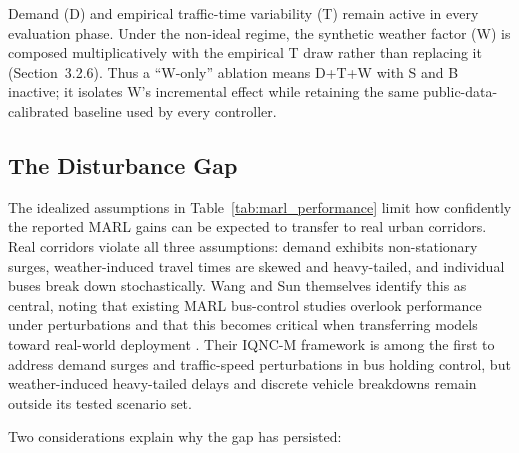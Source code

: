 Demand (D) and empirical traffic-time variability (T) remain active in every evaluation phase. Under the non-ideal regime, the synthetic weather factor (W) is composed multiplicatively with the empirical T draw rather than replacing it (Section~3.2.6). Thus a ``W-only'' ablation means D+T+W with S and B inactive; it isolates W's incremental effect while retaining the same public-data-calibrated baseline used by every controller.



\subsection{The Disturbance Gap}
\label{subsec:disturbance-gap}
The idealized assumptions in Table~\ref{tab:marl_performance} limit how confidently the reported MARL gains can be expected to transfer to real urban corridors. Real corridors violate all three assumptions: demand exhibits non-stationary surges, weather-induced travel times are skewed and heavy-tailed, and individual buses break down stochastically. Wang and Sun themselves identify this as central, noting that existing MARL bus-control studies overlook performance under perturbations and that this becomes critical when transferring models toward real-world deployment \cite{Wangsun}. Their IQNC-M framework is among the first to address demand surges and traffic-speed perturbations in bus holding control, but weather-induced heavy-tailed delays and discrete vehicle breakdowns remain outside its tested scenario set.

Two considerations explain why the gap has persisted:

